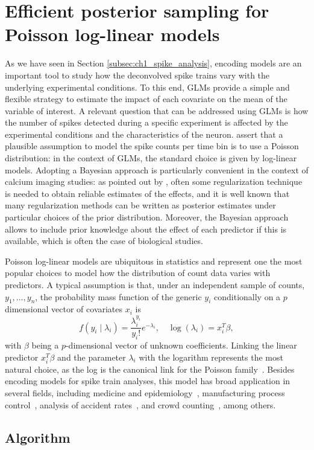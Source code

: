 \chapter{Efficient posterior sampling for Poisson log-linear models}



As we have seen in Section \ref{subsec:ch1_spike_analysis}, encoding models are an important tool to study how the deconvolved spike trains vary with the underlying experimental conditions. To this end, GLMs provide a simple and flexible strategy to estimate the impact of each covariate on the mean of the variable of interest.
A relevant question that can be addressed using GLMs is how the number of spikes detected during a specific experiment is affected by the experimental conditions and the characteristics of the neuron. \citet{paninski2007} assert that a plausible assumption to model the spike counts per time bin is to use a Poisson distribution: in the context of GLMs, the standard choice is given by log-linear models. 
Adopting a Bayesian approach is particularly convenient in the context of calcium imaging studies: as pointed out by \citet{paninski2007}, often some regularization technique is needed to obtain reliable estimates of the effects, and it is well known that many regularization methods can be written as posterior estimates under particular choices of the prior distribution.
Moreover, the Bayesian approach allows to include prior knowledge about the effect of each predictor if this is available, which is often the case of biological studies. 

Poisson log-linear models are ubiquitous in statistics and represent one the most popular choices to model how the distribution of count data varies with predictors. A typical assumption is that, under an independent sample of counts, $y_1, \dots, y_n$, the probability mass function of the generic $y_i$ conditionally on a $p$ dimensional vector of covariates $x_i$ is
\begin{equation*}
f(y_i \mid \lambda_i) =  \frac {\lambda_i^{y_i}}{{y_i}!}e^{-\lambda_i}, \quad \log(\lambda_i) = x_i^T \beta,
\label{eq:model0}
\end{equation*}
with $\beta$ being a $p$-dimensional vector of unknown coefficients. Linking the linear predictor $x_i^T \beta$ and the parameter $\lambda_i$ with the logarithm represents the most natural choice, as the log is the canonical link for the Poisson family~\citep{nelder1972glm}.
Besides encoding models for spike train analyses, this model has broad application in several fields, including medicine and epidemiology~\citep{Frome1983, frome1985, Hutchinson2005}, manufacturing process control~\citep{lambert1992}, analysis of accident rates~\citep{Sarath1990, Miaou1994}, and crowd counting~\citep{chan2009}, among others.



\section{Algorithm} 
\noindent

